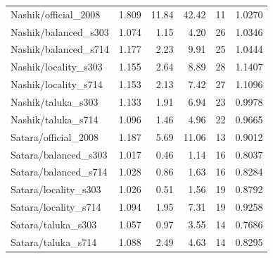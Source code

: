 \documentclass[11pt,a4paper,oneside]{report}
\begin{document}
\begin{center}
\begin{longtable}{p{5.4cm}rrrrr}
Nashik/official\_2008 & 1.809 & 11.84 & 42.42 & 11 & 1.0270\\
Nashik/balanced\_s303 & 1.074 & 1.15 & 4.20 & 26 & 1.0346\\
Nashik/balanced\_s714 & 1.177 & 2.23 & 9.91 & 25 & 1.0444\\
Nashik/locality\_s303 & 1.155 & 2.64 & 8.89 & 28 & 1.1407\\
Nashik/locality\_s714 & 1.153 & 2.13 & 7.42 & 27 & 1.1096\\
Nashik/taluka\_s303 & 1.133 & 1.91 & 6.94 & 23 & 0.9978\\
Nashik/taluka\_s714 & 1.096 & 1.46 & 4.96 & 22 & 0.9665\\
Satara/official\_2008 & 1.187 & 5.69 & 11.06 & 13 & 0.9012\\
Satara/balanced\_s303 & 1.017 & 0.46 & 1.14 & 16 & 0.8037\\
Satara/balanced\_s714 & 1.028 & 0.86 & 1.63 & 16 & 0.8284\\
Satara/locality\_s303 & 1.026 & 0.51 & 1.56 & 19 & 0.8792\\
Satara/locality\_s714 & 1.094 & 1.95 & 7.31 & 19 & 0.9258\\
Satara/taluka\_s303 & 1.057 & 0.97 & 3.55 & 14 & 0.7686\\
Satara/taluka\_s714 & 1.088 & 2.49 & 4.63 & 14 & 0.8295\\
\end{longtable}
\end{center}
\end{document}
